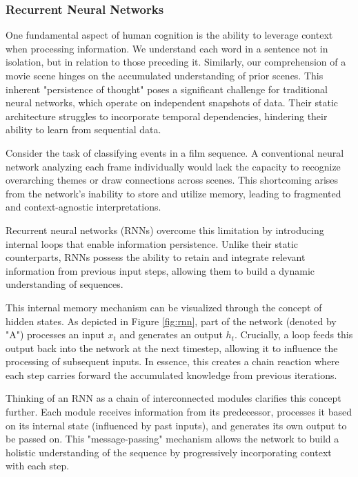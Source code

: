 \subsubsection{Recurrent Neural Networks \cite{olah2015} \cite{salamon2020}}
One fundamental aspect of human cognition is the ability to leverage context when processing information. We understand each word in a sentence not in isolation, but in relation to those preceding it. Similarly, our comprehension of a movie scene hinges on the accumulated understanding of prior scenes. This inherent "persistence of thought" poses a significant challenge for traditional neural networks, which operate on independent snapshots of data. Their static architecture struggles to incorporate temporal dependencies, hindering their ability to learn from sequential data.

Consider the task of classifying events in a film sequence. A conventional neural network analyzing each frame individually would lack the capacity to recognize overarching themes or draw connections across scenes. This shortcoming arises from the network's inability to store and utilize memory, leading to fragmented and context-agnostic interpretations.

Recurrent neural networks (RNNs) overcome this limitation by introducing internal loops that enable information persistence. Unlike their static counterparts, RNNs possess the ability to retain and integrate relevant information from previous input steps, allowing them to build a dynamic understanding of sequences.

This internal memory mechanism can be visualized through the concept of hidden states. As depicted in Figure \ref{fig:rnn}, part of the network (denoted by "A") processes an input $x_t$  and generates an output $h_t$. Crucially, a loop feeds this output back into the network at the next timestep, allowing it to influence the processing of subsequent inputs. In essence, this creates a chain reaction where each step carries forward the accumulated knowledge from previous iterations.

Thinking of an RNN as a chain of interconnected modules clarifies this concept further. Each module receives information from its predecessor, processes it based on its internal state (influenced by past inputs), and generates its own output to be passed on. This "message-passing" mechanism allows the network to build a holistic understanding of the sequence by progressively incorporating context with each step.

